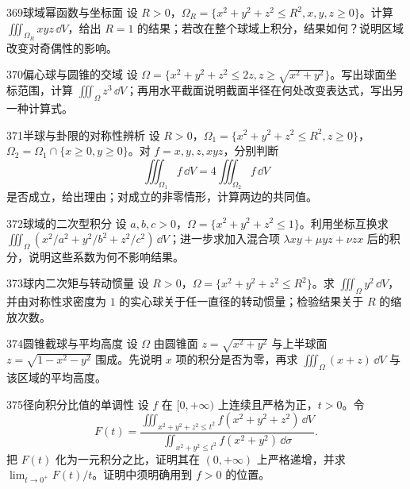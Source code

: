 \begin{exercise}{369}{球域幂函数与坐标面}
设 $R>0$，$\Omega_R=\{x^2+y^2+z^2\leq R^2,x,y,z\geq0\}$。计算 $\iiint_{\Omega_R}xyz\,\dd V$，给出 $R=1$ 的结果；若改在整个球域上积分，结果如何？说明区域改变对奇偶性的影响。
\end{exercise}

\begin{exercise}{370}{偏心球与圆锥的交域}
设 $\Omega=\{x^2+y^2+z^2\leq2z,z\geq\sqrt{x^2+y^2}\}$。写出球面坐标范围，计算 $\iiint_\Omega z^3\,\dd V$；再用水平截面说明截面半径在何处改变表达式，写出另一种计算式。
\end{exercise}

\begin{exercise}{371}{半球与卦限的对称性辨析}
设 $R>0$，$\Omega_1=\{x^2+y^2+z^2\leq R^2,z\geq0\}$，$\Omega_2=\Omega_1\cap\{x\geq0,y\geq0\}$。对 $f=x,y,z,xyz$，分别判断
\[
 \iiint_{\Omega_1}f\,\dd V=4\iiint_{\Omega_2}f\,\dd V
\]
是否成立，给出理由；对成立的非零情形，计算两边的共同值。
\end{exercise}

\begin{exercise}{372}{球域的二次型积分}
设 $a,b,c>0$，$\Omega=\{x^2+y^2+z^2\leq1\}$。利用坐标互换求
$\iiint_\Omega(x^2/a^2+y^2/b^2+z^2/c^2)\,\dd V$；进一步求加入混合项 $\lambda xy+\mu yz+\nu zx$ 后的积分，说明这些系数为何不影响结果。
\end{exercise}

\begin{exercise}{373}{球内二次矩与转动惯量}
设 $R>0$，$\Omega=\{x^2+y^2+z^2\leq R^2\}$。求 $\iiint_\Omega y^2\,\dd V$，并由对称性求密度为 $1$ 的实心球关于任一直径的转动惯量；检验结果关于 $R$ 的缩放次数。
\end{exercise}

\begin{exercise}{374}{圆锥截球与平均高度}
设 $\Omega$ 由圆锥面 $z=\sqrt{x^2+y^2}$ 与上半球面 $z=\sqrt{1-x^2-y^2}$ 围成。先说明 $x$ 项的积分是否为零，再求 $\iiint_\Omega(x+z)\,\dd V$ 与该区域的平均高度。
\end{exercise}

\begin{exercise}{375}{径向积分比值的单调性}
设 $f$ 在 $[0,+\infty)$ 上连续且严格为正，$t>0$。令
\[
 F(t)=\frac{\iiint_{x^2+y^2+z^2\leq t^2}f(x^2+y^2+z^2)\,\dd V}
 {\iint_{x^2+y^2\leq t^2}f(x^2+y^2)\,\dd\sigma}.
\]
把 $F(t)$ 化为一元积分之比，证明其在 $(0,+\infty)$ 上严格递增，并求 $\lim_{t\to0^+}F(t)/t$。证明中须明确用到 $f>0$ 的位置。
\end{exercise}

